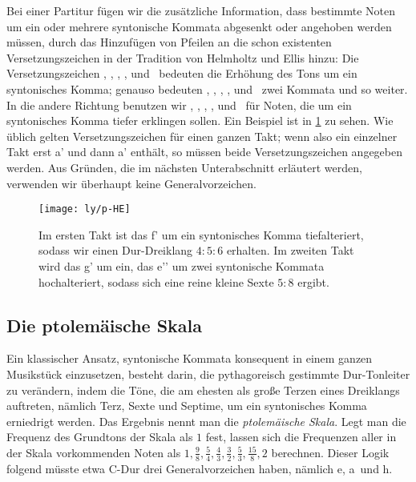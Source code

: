 Bei einer Partitur fügen wir die zusätzliche Information, dass bestimmte Noten
um ein oder mehrere syntonische Kommata abgesenkt oder angehoben werden müssen,
durch das Hinzufügen von Pfeilen an die schon existenten Versetzungszeichen in
der Tradition von Helmholtz und Ellis \cite{HE} hinzu: Die Versetzungszeichen
\dsharpp, \sharpp, \naturalp, \flatp, und \dflatp\ bedeuten die Erhöhung des
Tons um ein syntonisches Komma; genauso bedeuten \dsharppp, \sharppp,
\naturalpp, \flatpp, und \dflatpp\ zwei Kommata und so weiter. In die andere
Richtung benutzen wir \dsharpm, \sharpm, \naturalm, \flatm, und \dflatm\ für
Noten, die um ein syntonisches Komma tiefer erklingen sollen. Ein Beispiel ist
in \cref{fig:HE} zu sehen. Wie üblich gelten Versetzungszeichen für einen ganzen
Takt; wenn also ein einzelner Takt erst \naturalm a' und dann \natural a'
enthält, so müssen beide Versetzungszeichen angegeben werden. Aus Gründen, die
im nächsten Unterabschnitt erläutert werden, verwenden wir überhaupt keine
Generalvorzeichen.

\begin{figure}\centering
  \texttt{[image: ly/p-HE]}
  \caption{Im ersten Takt ist das \sharp f’ um ein syntonisches Komma
    tiefalteriert, sodass wir einen Dur-Dreiklang $4:5:6$ erhalten. Im zweiten
    Takt wird das g’ um ein, das \flat e’’ um zwei syntonische Kommata
    hochalteriert, sodass sich eine reine kleine Sexte $5:8$
    ergibt.}\label{fig:HE}
\end{figure}

\subsection{Die ptolemäische Skala}
\label{subsec:ptol}

Ein klassischer Ansatz, syntonische Kommata konsequent in einem
ganzen Musikstück einzusetzen, besteht darin, die pythagoreisch gestimmte
Dur-Tonleiter zu verändern, indem die Töne, die am ehesten als große Terzen
eines Dreiklangs auftreten, nämlich Terz, Sexte und Septime, um ein syntonisches
Komma erniedrigt werden. Das Ergebnis nennt man die \emph{ptolemäische
  Skala}. Legt man die Frequenz des Grundtons der Skala als $1$ fest, lassen
sich die Frequenzen aller in der Skala vorkommenden Noten als
$1,\frac98,\frac54,\frac43,\frac32,\frac53,\frac{15}8,2$ berechnen. Dieser Logik
folgend müsste etwa C-Dur drei Generalvorzeichen haben, nämlich \naturalp e,
\naturalp a\ und \naturalp h.

